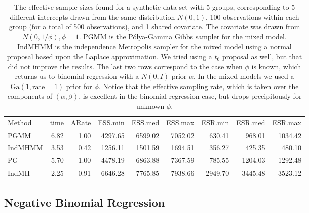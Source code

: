 \documentclass{article}
\newcommand{\Polya}{P\'{o}lya}
\begin{document}
\begin{table}
\label{tab:mm-example}
\begin{tabular}{l r r r r r r r r } 
 Method  &     time &    ARate &  ESS.min &  ESS.med &  ESS.max &  ESR.min &  ESR.med &  ESR.max \\ 
   PGMM  &     6.82 &     1.00 &  4297.65 &  6599.02 &  7052.02 &   630.41 &   968.01 &  1034.42 \\ 
IndMHMM  &     3.53 &     0.42 &  1256.11 &  1501.59 &  1694.51 &   356.27 &   425.35 &   480.10 \\ 
     PG  &     5.70 &     1.00 &  4478.19 &  6863.88 &  7367.59 &   785.55 &  1204.03 &  1292.48 \\ 
  IndMH  &     2.25 &     0.91 &  6646.28 &  7765.85 &  7938.66 &  2949.70 &  3445.48 &  3523.12
 \end{tabular}
 \caption{
   The effective sample sizes found for a synthetic data set with 
   5 groups, corresponding to 5 different intercepts drawn from the same
   distribution $N(0, 1)$, 100 observations within each group (for a total of
   500 observations), and 1 shared covariate.  The covariate was drawn from
   $N(0,1/\phi), \phi=1$.  PGMM is the \Polya-Gamma Gibbs sampler for the mixed model.  IndMHMM
   is the independence Metropolis sampler for the mixed model using a normal
   proposal based upon the Laplace approximation.  We tried using a $t_6$ proposal
   as well, but that did not improve the results.  The last two rows correspond to
   the case when $\phi$ is known, which returns us to binomial regression with a
   $N(0, I)$ prior $\alpha$.  In the mixed models we used a $\text{Ga}(1,
   \text{rate}=1)$ prior for $\phi$.  Notice that the effective sampling rate,
   which is taken over the components of $(\alpha, \beta)$, is
   excellent in the binomial regression case, but drops precipitously for
   unknown $\phi$.
 }
\end{table}

\subsection{Negative Binomial Regression}
\end{document}
